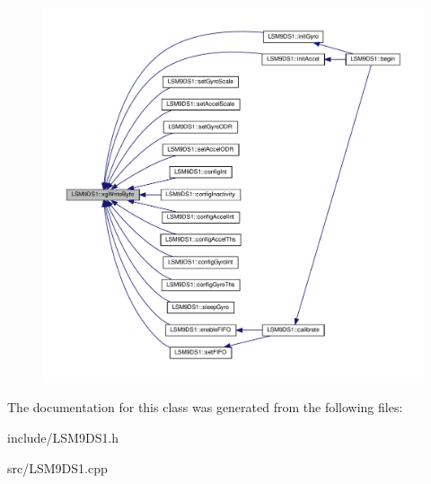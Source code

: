 \begin{figure}[H]
\begin{center}
\leavevmode
\includegraphics[width=350pt]{classLSM9DS1_a263eed4b52ad087a1195755c6ba49e62_icgraph}
\end{center}
\end{figure}


The documentation for this class was generated from the following files\+:\begin{DoxyCompactItemize}
\item 
include/L\+S\+M9\+D\+S1.\+h\item 
src/L\+S\+M9\+D\+S1.\+cpp\end{DoxyCompactItemize}
